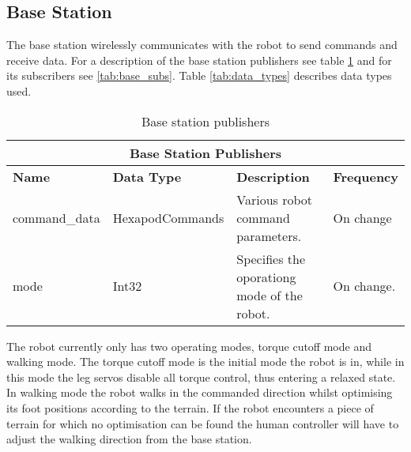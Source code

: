     \subsection{Base Station} \label{sec:base_ros}
        The base station wirelessly communicates with the robot to send commands and receive data.
        For a description of the base station publishers see table \ref{tab:base_pubs} and for its subscribers see \ref{tab:base_subs}. Table \ref{tab:data_types} describes
        data types used.
        \begin{table}[h]
            \centering
            \begin{tabularx}{\textwidth}{| l | l | X | l |}
                \hline
                \multicolumn{4}{|c|}{\textbf{Base Station Publishers}} \\ \hline
                \textbf{Name} & \textbf{Data Type} & \textbf{Description} & \textbf{Frequency} \\ \hline
                command\_data & HexapodCommands & Various robot command parameters. & On change \\ \hline
                mode & Int32 & Specifies the oporationg mode of the robot. & On change. \\ \hline
            \end{tabularx}
            \caption{Base station publishers}
            \label{tab:base_pubs}
        \end{table}
        
        \noindent
        The robot currently only has two operating modes, torque cutoff mode and walking mode. The torque cutoff mode is the initial mode the robot is in,
        while in this mode the leg servos disable all torque control, thus entering a relaxed state. In walking mode the robot walks in the commanded direction
        whilst optimising its foot positions according to the terrain. If the robot encounters a piece of terrain for which no optimisation can be found the
        human controller will have to adjust the walking direction from the base station.

